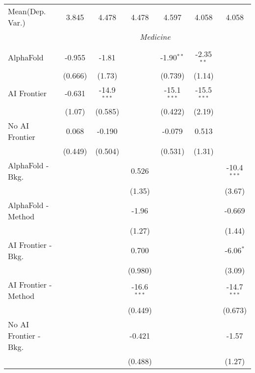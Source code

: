 \begin{tabular}{lcccccc}
Mean(Dep. Var.) & 3.845 & 4.478 & 4.478 & 4.597 & 4.058 & 4.058 \\
 & \multicolumn{6}{c}{\textit{Medicine}} \\ \\
   AlphaFold               & -0.955  & -1.81         &               & -1.90$^{**}$  & -2.35$^{**}$  &   \\   
                           & (0.666) & (1.73)        &               & (0.739)       & (1.14)        &   \\   
   AI Frontier             & -0.631  & -14.9$^{***}$ &               & -15.1$^{***}$ & -15.5$^{***}$ &   \\   
                           & (1.07)  & (0.585)       &               & (0.422)       & (2.19)        &   \\   
   No AI Frontier          & 0.068   & -0.190        &               & -0.079        & 0.513         &   \\   
                           & (0.449) & (0.504)       &               & (0.531)       & (1.31)        &   \\   
   AlphaFold - Bkg.        &         &               & 0.526         &               &               & -10.4$^{***}$\\   
                           &         &               & (1.35)        &               &               & (3.67)\\   
   AlphaFold - Method      &         &               & -1.96         &               &               & -0.669\\   
                           &         &               & (1.27)        &               &               & (1.44)\\   
   AI Frontier - Bkg.      &         &               & 0.700         &               &               & -6.06$^{*}$\\   
                           &         &               & (0.980)       &               &               & (3.09)\\   
   AI Frontier - Method    &         &               & -16.6$^{***}$ &               &               & -14.7$^{***}$\\   
                           &         &               & (0.449)       &               &               & (0.673)\\   
   No AI Frontier - Bkg.   &         &               & -0.421        &               &               & -1.57\\   
                           &         &               & (0.488)       &               &               & (1.27)\\   

\end{tabular}
